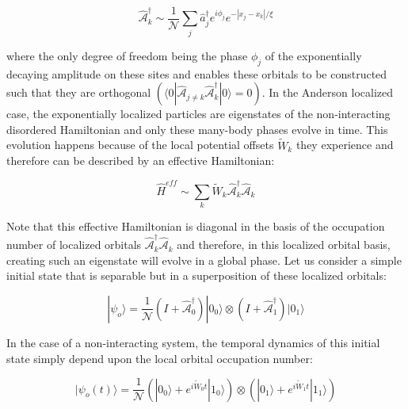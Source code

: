 \begin{equation}
\hat{\mathcal{A}}_k^\dagger \sim \frac{1}{\mathcal{N}} \sum_j \hat{a}_j^\dagger e^{i \phi_j} e^{-| x_j - x_k |/\xi }
\label{eqn:AHAT}
\end{equation}

where the only degree of freedom being the phase $\phi_j$ of the exponentially decaying amplitude on these sites and enables these orbitals to be constructed such that they are orthogonal $\left ( \langle 0 | \hat{\mathcal{A}}_{j\neq k} \hat{\mathcal{A}}^\dagger_k |0\rangle = 0 \right )$. In the Anderson localized case, the exponentially localized particles are eigenstates of the non-interacting disordered Hamiltonian and only these many-body phases evolve in time. This evolution happens because of the local potential offsets $\tilde{W}_k$ they experience and therefore can be described by an effective Hamiltonian:

\begin{equation}
\hat{H}^{eff} \sim \sum_k \tilde{W}_k \hat{\mathcal{A}}_k^\dagger \hat{\mathcal{A}}_k
\label{eqn:ahatHam}
\end{equation}

Note that this effective Hamiltonian is diagonal in the basis of the occupation number of localized orbitals $\hat{\mathcal{A}}_k^\dagger \hat{\mathcal{A}}_k$ and therefore, in this localized orbital basis, creating such an eigenstate will evolve in a global phase. Let us consider a simple initial state that is separable but in a superposition of these localized orbitals:
 
 \begin{equation}
 |\psi_o\rangle =\frac{1}{\mathcal{N}} \left (I+\hat{\mathcal{A}}_0^\dagger \right )|0_0\rangle \otimes \left ( I+\hat{\mathcal{A}}_1^\dagger \right ) |0_1 \rangle 
 \end{equation}
 
 In the case of a non-interacting system, the temporal dynamics of this initial state simply depend upon the local orbital occupation number:
 
 \begin{equation}
 |\psi_o (t) \rangle =\frac{1}{\mathcal{N}} \left (|0_0\rangle + e^{i \tilde{W}_0 t} |1_0 \rangle \right ) \otimes \left (|0_1\rangle + e^{i \tilde{W}_1 t} |1_1 \rangle \right ) 
 \label{eqn:psi_time}
 \end{equation}
 
